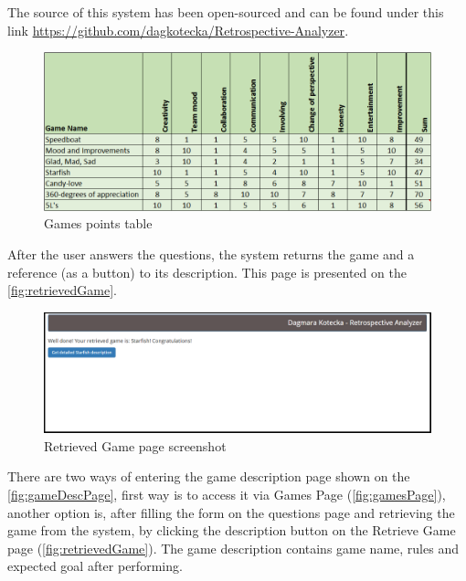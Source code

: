 The source of this system has been open-sourced and can be found under this link \url{https://github.com/dagkotecka/Retrospective-Analyzer}.

\begin{figure}[h]
\caption{Games points table}
\label{fig:gamesPoints}
\centering
\includegraphics[width=1\textwidth]{screenshots/gamesPoints.png}
\end{figure}

After the user answers the questions, the system returns the game and a reference (as a button) to its description. This page is presented on the \autoref{fig:retrievedGame}.

\begin{figure}[h]
\caption{Retrieved Game page screenshot}
\label{fig:retrievedGame}
\centering
\includegraphics[width=1\textwidth]{screenshots/retrievedGame.png}
\end{figure}

There are two ways of entering the game description page shown on the \autoref{fig:gameDescPage}, first way is to access it via Games Page (\autoref{fig:gamesPage}), another option is, after filling the form on the questions page and retrieving the game from the system, by clicking the description button on the Retrieve Game page (\autoref{fig:retrievedGame}). The game description contains game name, rules and expected goal after performing. 

